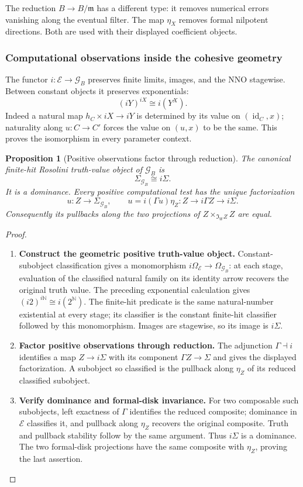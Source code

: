 \documentclass[11pt,a4paper]{article}
\numberwithin{algorithm}{section}
\numberwithin{equation}{section}
\newtheorem{proposition}[proposition]{Proposition}
\theoremstyle{definition}
\theoremstyle{remark}
\theoremstyle{plain}
\newcommand{\E}{\mathcal E}
\newcommand{\N}{\mathbb N}
\newcommand{\id}{\operatorname{id}}
\newcommand{\Geo}{\mathcal G_B}
\newcommand{\Shape}{\mathfrak I_W}
\theoremstyle{definition}
\theoremstyle{plain}
\begin{document}
The reduction $B\to B/\mathfrak m$ has a different type:
it removes numerical errors vanishing along the eventual
filter. The map $\eta_X$ removes formal nilpotent directions.
Both are used with their displayed coefficient objects.

\subsubsection{Computational observations inside the cohesive geometry}
\label{sec:geometric-effectivity}
The functor $i:\E\to\Geo$ preserves finite limits, images, and the NNO
stagewise. Between constant objects it preserves exponentials:
\[
 (iY)^{iX}\cong i(Y^X).
\]
Indeed a natural map $h_C\times iX\to iY$ is determined by its value
on $(\id_C,x)$; naturality along $u:C\to C'$ forces the value on
$(u,x)$ to be the same. This proves the isomorphism in every parameter
context.

\begin{proposition}[Positive observations factor through reduction]
\label{prop:geometric-dominance}
The canonical finite-hit Rosolini truth-value object of $\Geo$ is
\[
 \Sigma_{\Geo}\cong i\Sigma.
\]
It is a dominance. Every positive computational test has the unique
factorization
\[
 u:Z\to\Sigma_{\Geo},\qquad
 u=i(\Gamma u)\eta_Z:Z\to i\Gamma Z\to i\Sigma.
\]
Consequently its pullbacks along the two projections of
$Z\times_{\Shape Z}Z$ are equal.
\end{proposition}
\begin{proof}\leavevmode
\begin{enumerate}[leftmargin=*,align=left]
\item \textbf{Construct the geometric positive truth-value object.}
Constant-subobject classification gives a monomorphism
$i\Omega_{\E}\to\Omega_{\Geo}$: at each stage, evaluation of the
classified natural family on its identity arrow recovers the original
truth value. The preceding exponential calculation gives
$(i2)^{i\N}\cong i(2^\N)$. The finite-hit predicate is the same
natural-number existential at every stage; its classifier is the
constant finite-hit classifier followed by this monomorphism. Images
are stagewise, so its image is $i\Sigma$.

\item \textbf{Factor positive observations through reduction.}
The adjunction $\Gamma\dashv i$ identifies a map $Z\to i\Sigma$ with
its component $\Gamma Z\to\Sigma$ and gives the displayed factorization.
A subobject so classified is the pullback along $\eta_Z$ of its reduced
classified subobject.

\item \textbf{Verify dominance and formal-disk invariance.}
For two composable such subobjects, left exactness
of $\Gamma$ identifies the reduced composite; dominance in $\E$
classifies it, and pullback along $\eta_Z$ recovers the original
composite. Truth and pullback stability follow by the same argument.
Thus $i\Sigma$ is a dominance. The two formal-disk projections have
the same composite with $\eta_Z$, proving the last assertion.
\end{enumerate}
\end{proof}
\end{document}
